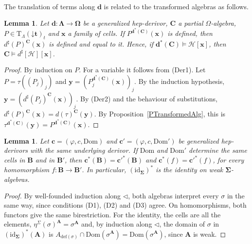 \documentclass[a4paper,reqno]{amsart}
\newcommand{\vs}[1]{\mathbin{\downarrow}#1}      %
\newcommand{\sig}[1]{\mathbf{#1}}                %
\newcommand{\Dom}{\mathrm{Dom}}
\newcommand{\id}{\mathrm{id}}
\newcommand{\mor}{\to}
\newcommand{\T}{\mathrm{T}}
\newcommand{\defi}{\mathrm{def}}
\theoremstyle{plain}
\newtheorem{lemma}[theorem]{Lemma}
\theoremstyle{definition}
\begin{document}
The translation of terms along $\mathbf{d}$ is related to the transformed algebras as follows.

\begin{lemma}\label{LTermComp}
Let $\mathbf{d}\colon\sig{\Lambda}\mor\sig{\Omega}$ be a generalized hep-derivor, $\mathbf{C}$ a partial $\Omega$-algebra, $P\in\T_{\Lambda}(\vs{\mathbf{t}})_{t}$ and $\mathbf{x}$ a family of cells.
If $P^{\mathbf{d}^{\ast}(\mathbf{C})}(\mathbf{x})$ is defined, then $d^{\sharp}(P)^{\mathbf{C}}(\mathbf{x})$ is defined and equal to it.
Hence, if $\mathbf{d}^{\ast}(\mathbf{C})\models\mathcal{H}[\mathbf{x}]$, then $\mathbf{C}\models d^{\sharp}[\mathcal{H}][\mathbf{x}]$.
\end{lemma}
\begin{proof}
By induction on $P$.
For a variable it follows from (Der1).
Let $P=\tau((P_{j})_{j})$ and $\mathbf{y}=(P_{j}^{\mathbf{d}^{\ast}(\mathbf{C})}(\mathbf{x}))_{j}$.
By the induction hypothesis, $\mathbf{y}=(d^{\sharp}(P_{j})^{\mathbf{C}}(\mathbf{x}))_{j}$.
By (Der2) and the behaviour of substitutions, $d^{\sharp}(P)^{\mathbf{C}}(\mathbf{x})=d(\tau)^{\mathbf{C}}(\mathbf{y})$.
By Proposition~\ref{PTransformedAlg}, this is $\tau^{\mathbf{d}^{\ast}(\mathbf{C})}(\mathbf{y})=P^{\mathbf{d}^{\ast}(\mathbf{C})}(\mathbf{x})$.
\end{proof}

\begin{lemma}\label{LSameCells}
Let $\mathbf{c}=(\varphi,c,\Dom)$ and $\mathbf{c}'=(\varphi,c,\Dom')$ be generalized hep-derivors with the same underlying derivor.
If $\Dom$ and $\Dom'$ determine the same cells in $\mathbf{B}$ and in $\mathbf{B}'$, then $\mathbf{c}^{\ast}(\mathbf{B})=\mathbf{c}'^{\ast}(\mathbf{B})$ and $\mathbf{c}^{\ast}(f)=\mathbf{c}'^{\ast}(f)$, for every homomorphism $f\colon\mathbf{B}\mor\mathbf{B}'$.
In particular, $(\id_{\sig{\Sigma}})^{\ast}$ is the identity on weak $\sig{\Sigma}$-algebras.
\end{lemma}
\begin{proof}
By well-founded induction along $\lhd$, both algebras interpret every $\sigma$ in the same way, since conditions (D1), (D2) and (D3) agree.
On homomorphisms, both functors give the same birestriction.
For the identity, the cells are all the elements, $\eta^{\Sigma}(\sigma)^{\mathbf{A}}=\sigma^{\mathbf{A}}$ and, by induction along $\lhd$, the domain of $\sigma$ in $(\id_{\sig{\Sigma}})^{\ast}(\mathbf{A})$ is $A_{\defi(\sigma)}\cap\Dom(\sigma^{\mathbf{A}})=\Dom(\sigma^{\mathbf{A}})$, since $\mathbf{A}$ is weak.
\end{proof}
\end{document}
